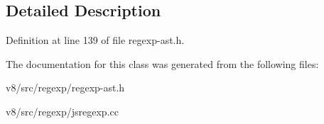 \subsection{Detailed Description}


Definition at line 139 of file regexp-\/ast.\+h.



The documentation for this class was generated from the following files\+:\begin{DoxyCompactItemize}
\item 
v8/src/regexp/regexp-\/ast.\+h\item 
v8/src/regexp/jsregexp.\+cc\end{DoxyCompactItemize}
